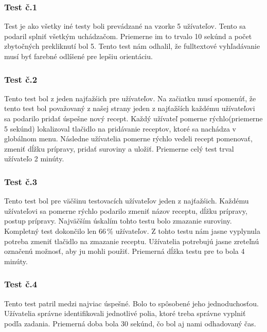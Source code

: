 \documentclass[12pt,a4paper,titlepage,final]{article}
\begin{document}
\subsubsection{Test č.1}
Test je ako všetky iné testy boli prevádzané na vzorke 5 užívateľov. Tento sa podaril splniť všetkým uchádzačom. Priemerne im to trvalo 10 sekúnd a počet zbytočných prekliknutí bol 5. Tento test nám odhalil, že fulltextové vyhľadávanie musí byť farebné odlíšené pre lepšiu orientáciu.

\subsubsection{Test č.2}
Tento test bol z jeden najťažśich pre užívateľov. Na začiatku musí spomenúť, že tento test bol považovaný  z našej strany jeden z najťažších každému užívateľovi sa podarilo pridať úspešne nový recept. Každý užívateľ pomerne rýchlo(priemerne 5 sekúnd) lokalizoval tlačidlo na pridávanie receptov, ktoré sa nachádza v globálnom menu. Následne užívatelia pomerne rýchlo vedeli recept pomenovať, zmeniť dĺžku prípravy, pridať suroviny a uložiť. Priemerne celý test trval užívateľo 2 minúty.


\subsubsection{Test č.3}
Tento test bol pre väčšinu testovacích užívateľov jeden z najťažśich. Každému užívateľovi sa pomerne rýchlo podarilo zmeniť názov receptu, dĺžku prípravy, postup prípravy. Najväčším úskalím tohto testu bolo zmazanie suroviny. Kompletný test dokončilo len 66\,\% užívateľov.
Z tohto testu nám jasne vyplynula potreba zmeniť tlačidlo na zmazanie receptu. Užívatelia potrebujú jasne zreteľnú označenú možnosť, aby ju mohli použiť. Priemerná dĺžka testu pre to bola 4 minúty.

\subsubsection{Test č.4} 
Tento test patril medzi najviac úspešné. Bolo to spôsobené jeho jednoduchosťou. Užívatelia správne identifikovali jednotlivé polia, ktoré treba správne vyplniť podľa zadania. Priemerná doba bola 30 sekúnd, čo bol aj nami odhadovaný čas.
\end{document}
